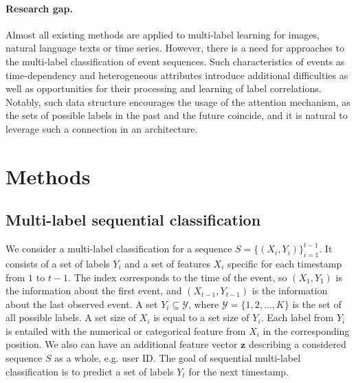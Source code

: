 \documentclass[runningheads]{llncs}
\newcommand{\vecX}{\mathbf{x}}
\begin{document}
\paragraph{\textbf{Research gap.}}
Almost all existing methods are applied to multi-label learning for images, natural language texts or time series. 
However, there is a need for approaches to the multi-label classification of event sequences. Such characteristics of events as time-dependency and heterogeneous attributes introduce additional difficulties as well as opportunities for their processing and learning of label correlations. Notably, such data structure encourages the usage of the attention mechanism, as the sets of possible labels in the past and the future coincide, and it is natural to leverage such a connection in an architecture. 


\section{Methods} 
\label{sec:methods}


\subsection{Multi-label sequential classification}


We consider a multi-label classification for a sequence $S = \{(X_{i}, Y_{i})\}_{i = 1}^{t-1}$.
It consists of a set of labels $Y_i$ and a set of features $X_{i}$ specific for each timestamp from $1$ to $t-1$. The index corresponds to the time of the event, so $(X_{1}, Y_{1})$ is the information about the first event, and $(X_{t-1}, Y_{t-1})$ is the information about the last observed event.
A set $Y_i \subseteq \mathcal{Y}$, where $\mathcal{Y} = \{1, 2, \dots, K\}$ is the set of all possible labels. A set size of $X_{i}$ is equal to a set size of $Y_{i}$. Each label from $Y_{i}$ is entailed with the numerical or categorical feature from $X_{i}$ in the corresponding position. 
We also can have an additional feature vector $\mathbf{z}$ describing a considered sequence $S$ as a whole, e.g. user ID.
The goal of sequential multi-label classification is to predict a set of labels $Y_{t}$ for the next timestamp.
\end{document}
